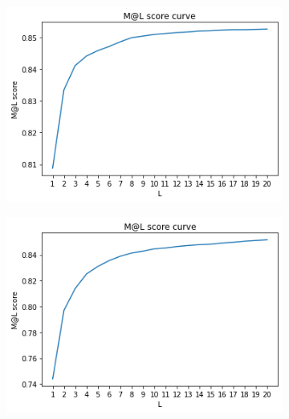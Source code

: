 \documentclass[10pt,a4paper,fleqn]{report}
\begin{document}
					\begin{figure}[htbp]
						\centering
						\begin{subfigure}[b]{0.48\textwidth}
							\centering
							\includegraphics[width=\textwidth]{figure/partA_bm25_ml_score.png}
							\caption{}
							\label{fig: bm25_mlscore}
						\end{subfigure}
						\hfill
						\begin{subfigure}[b]{0.48\textwidth}
							\centering
							\includegraphics[width=\textwidth]{figure/partA_sent2vec_ml_score.png}
							\caption{}
							\label{fig: sent2vec_mlscore}
						\end{subfigure}
						\hfill
						\begin{subfigure}[b]{0.48\textwidth}
							\centering

\end{subfigure}
\end{figure}
\end{document}
